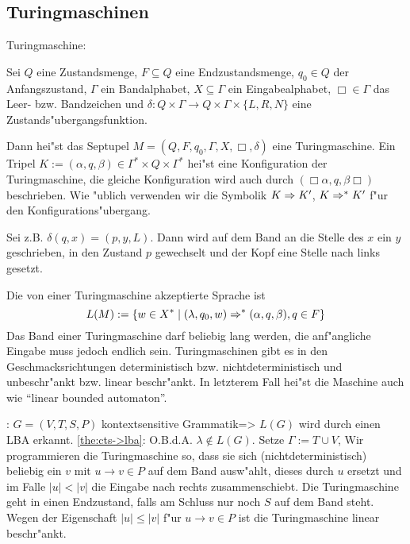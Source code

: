 \subsection{Turingmaschinen}
 Turingmaschine:{
  Sei $Q$ eine Zustandsmenge, $F\subseteq Q$ eine Endzustandsmenge, 
  $q_0\in Q$ der Anfangszustand, $\Gamma$ ein Bandalphabet,
  $X\subseteq \Gamma$ ein Eingabealphabet, $\Box\in\Gamma$ das Leer- bzw.
  Bandzeichen und $\delta:Q\times\Gamma\to Q\times\Gamma\times\{L,R,N\}$
  eine Zustands"ubergangsfunktion.
  
  Dann hei"st das Septupel $M=(Q,F,q_0,\Gamma,X,\Box,\delta)$ eine 
  Turingmaschine. Ein Tripel 
  $K:=(\alpha,q,\beta)\in \Gamma^*\times Q\times\Gamma^*$ hei"st eine 
  Konfiguration der Turingmaschine, die gleiche Konfiguration wird auch
  durch $(\Box\alpha,q,\beta\Box)$ beschrieben. Wie "ublich verwenden
  wir die Symbolik $K\Rightarrow K'$, $K\Rightarrow^* K'$ f"ur den 
  Konfigurations"ubergang.
  
  Sei z.B. $\delta(q,x)=(p,y,L)$. Dann wird auf dem Band an die Stelle des
  $x$ ein $y$ geschrieben, in den Zustand $p$ gewechselt und der Kopf eine
  Stelle nach links gesetzt.
  
  Die von einer Turingmaschine akzeptierte Sprache ist
  \[L(M):=\{w\in X^*\mid (\lambda,q_0,w)\Rightarrow^*(\alpha,q,\beta), q\in F\}
    \]
  Das Band einer Turingmaschine darf beliebig lang werden,
  die anf"angliche Eingabe muss jedoch endlich sein. Turingmaschinen gibt
  es in den Geschmacksrichtungen deterministisch bzw. nichtdeterministisch und
  unbeschr"ankt bzw. linear beschr"ankt. In letzterem Fall hei"st die Maschine
  auch  wie ``linear bounded automaton''.
  }
\theorem:
  $G=(V,T,S,P)$ kontextsensitive Grammatik=>{
  \label{the:cts->lba}
  $L(G)$ wird durch einen LBA erkannt.
  }
\proof \ref{the:cts->lba}:{
  O.B.d.A. $\lambda\not\in L(G)$.
  Setze $\Gamma:=T\cup V$, 
  Wir programmieren die Turingmaschine so, dass sie sich 
  (nichtdeterministisch) beliebig ein
  $v$ mit $u\to v\in P$ auf dem Band ausw"ahlt, dieses durch $u$ ersetzt
  und im Falle $|u|<|v|$ die Eingabe nach rechts zusammenschiebt. Die
  Turingmaschine geht in einen Endzustand, falls am Schluss nur noch $S$ auf
  dem Band steht. Wegen der Eigenschaft $|u|\le|v|$ f"ur $u\to v\in P$ ist
  die Turingmaschine linear beschr"ankt.
  }
